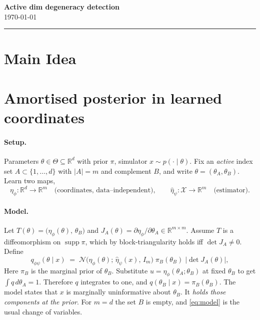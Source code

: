 \documentclass[11pt, letterpaper]{article}
\newcommand{\MyName}{T. Lucas Makinen}
\newcommand{\MyInstitution}{University of Cambridge}
\newcommand{\MyCourse}{Active dim degeneracy detection}
\newcommand{\MyDate}{\today}
\theoremstyle{definition}
\begin{document}
\begin{center}
    {\Large \textbf{\MyCourse}} \\ [0.5em]
    {\small \MyDate}
\end{center}
\hrule
\vspace{1em}

\vspace{1em}

\section*{Main Idea}

\section*{Amortised posterior in learned coordinates}

\paragraph{Setup.}
Parameters $\theta\in\Theta\subseteq\mathbb{R}^d$ with prior $\pi$, simulator
$x\sim p(\cdot\mid\theta)$. Fix an \emph{active} index set
$A\subset\{1,\dots,d\}$ with $|A|=m$ and complement $B$, and write
$\theta=(\theta_A,\theta_B)$. Learn two maps,
\[
  \eta_\phi:\mathbb{R}^d\to\mathbb{R}^m
  \quad\text{(coordinates, data--independent)},
  \qquad
  \hat\eta_\psi:\mathcal{X}\to\mathbb{R}^m
  \quad\text{(estimator)} .
\]

\paragraph{Model.}
Let $T(\theta)=\bigl(\eta_\phi(\theta),\,\theta_B\bigr)$ and
$J_A(\theta)=\partial\eta_\phi/\partial\theta_A\in\mathbb{R}^{m\times m}$.
Assume $T$ is a diffeomorphism on $\operatorname{supp}\pi$, which by
block-triangularity holds iff $\det J_A\neq0$. Define
\begin{equation}
  q_{\phi\psi}(\theta\mid x)
  \;=\;
  \mathcal{N}\bigl(\eta_\phi(\theta);\,\hat\eta_\psi(x),\,I_m\bigr)\;
  \pi_B(\theta_B)\;
  \bigl|\det J_A(\theta)\bigr| ,
  \label{eq:model}
\end{equation}
Here $\pi_B$ is the marginal prior of $\theta_B$. Substitute
$u=\eta_\phi(\theta_A;\theta_B)$ at fixed $\theta_B$ to get
$\int q\,d\theta_A=1$. Therefore $q$ integrates to one, and
$q(\theta_B\mid x)=\pi_B(\theta_B)$. The model states that $x$ is marginally
uninformative about $\theta_B$. It \emph{holds those components at the prior}.
For $m=d$ the set $B$ is empty, and \eqref{eq:model} is the usual change of
variables.
\end{document}
